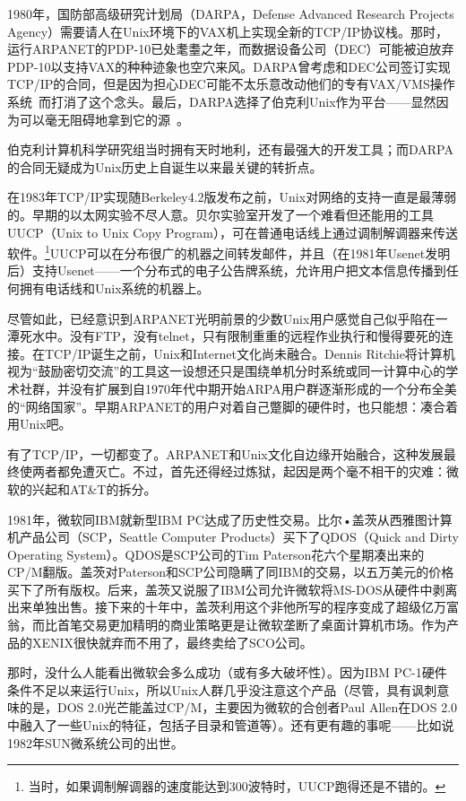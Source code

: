 \documentclass[12pt,oneside]{ctexbook}
\begin{document}
\begin{common-format}
1980年，国防部高级研究计划局（DARPA，Defense Advanced Research Projects Agency）需要请人在Unix环境下的VAX机上实现全新的TCP/IP协议栈。那时，运行ARPANET的PDP-10已处耄耋之年，而数据设备公司（DEC）可能被迫放弃PDP-10以支持VAX的种种迹象也空穴来风。DARPA曾考虑和DEC公司签订实现TCP/IP的合同，但是因为担心DEC可能不太乐意改动他们的专有VAX/VMS操作系统~\cite{Libes-Ressler}而打消了这个念头。最后，DARPA选择了伯克利Unix作为平台——显然因为可以毫无阻碍地拿到它的源~\cite{Leonard}。

伯克利计算机科学研究组当时拥有天时地利，还有最强大的开发工具；而DARPA的合同无疑成为Unix历史上自诞生以来最关键的转折点。

在1983年TCP/IP实现随Berkeley4.2版发布之前，Unix对网络的支持一直是最薄弱的。早期的以太网实验不尽人意。贝尔实验室开发了一个难看但还能用的工具UUCP（Unix to Unix Copy Program），可在普通电话线上通过调制解调器来传送软件。\footnote{当时，如果调制解调器的速度能达到300波特时，UUCP跑得还是不错的。}UUCP可以在分布很广的机器之间转发邮件，并且（在1981年Usenet发明后）支持Usenet——一个分布式的电子公告牌系统，允许用户把文本信息传播到任何拥有电话线和Unix系统的机器上。

尽管如此，已经意识到ARPANET光明前景的少数Unix用户感觉自己似乎陷在一潭死水中。没有FTP，没有telnet，只有限制重重的远程作业执行和慢得要死的连接。在TCP/IP诞生之前，Unix和Internet文化尚未融合。Dennis Ritchie将计算机视为“鼓励密切交流”的工具这一设想还只是围绕单机分时系统或同一计算中心的学术社群，并没有扩展到自1970年代中期开始ARPA用户群逐渐形成的一个分布全美的“网络国家”。早期ARPANET的用户对着自己蹩脚的硬件时，也只能想：凑合着用Unix吧。

有了TCP/IP，一切都变了。ARPANET和Unix文化自边缘开始融合，这种发展最终使两者都免遭灭亡。不过，首先还得经过炼狱，起因是两个毫不相干的灾难：微软的兴起和AT\&{}T的拆分。

1981年，微软同IBM就新型IBM PC达成了历史性交易。比尔•盖茨从西雅图计算机产品公司（SCP，Seattle Computer Products）买下了QDOS（Quick and Dirty Operating System）。QDOS是SCP公司的Tim Paterson花六个星期凑出来的CP/M翻版。盖茨对Paterson和SCP公司隐瞒了同IBM的交易，以五万美元的价格买下了所有版权。后来，盖茨又说服了IBM公司允许微软将MS-DOS从硬件中剥离出来单独出售。接下来的十年中，盖茨利用这个非他所写的程序变成了超级亿万富翁，而比首笔交易更加精明的商业策略更是让微软垄断了桌面计算机市场。作为产品的XENIX很快就弃而不用了，最终卖给了SCO公司。

那时，没什么人能看出微软会多么成功（或有多大破坏性）。因为IBM PC-1硬件条件不足以来运行Unix，所以Unix人群几乎没注意这个产品（尽管，具有讽刺意味的是，DOS 2.0光芒能盖过CP/M，主要因为微软的合创者Paul Allen在DOS 2.0中融入了一些Unix的特征，包括子目录和管道等）。还有更有趣的事呢——比如说1982年SUN微系统公司的出世。


\end{common-format}
\end{document}
